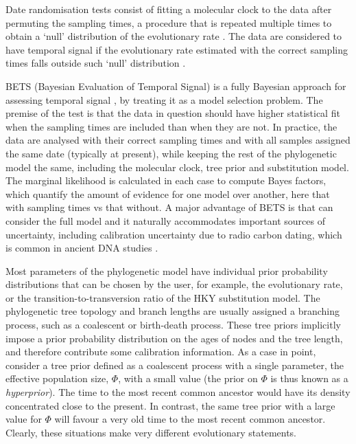 \documentclass[10pt,letterpaper]{article}
\begin{document}
Date randomisation tests consist of fitting a molecular clock to the data after permuting the sampling times, a procedure that is repeated multiple times to obtain a `null' distribution of the evolutionary rate \cite{ramsden2009hantavirus}. The data are considered to have temporal signal if the evolutionary rate estimated with the correct sampling times falls outside such `null' distribution \cite{ramsden2009hantavirus,duchene2015performance}.

BETS (Bayesian Evaluation of Temporal Signal) is a fully Bayesian approach for assessing temporal signal \cite{duchene2020bayesian}, by treating it as a model selection problem. The premise of the test is that the data in question should have higher statistical fit when the sampling times are included than when they are not. In practice, the data are analysed with their correct sampling times and with all samples assigned the same date (typically at present), while keeping the rest of the phylogenetic model the same, including the molecular clock, tree prior and substitution model. The marginal likelihood is calculated in each case to compute Bayes factors, which quantify the amount of evidence for one model over another, here that with sampling times vs that without. A major advantage of BETS is that can consider the full model and it naturally accommodates important sources of uncertainty, including calibration uncertainty due to radio carbon dating, which is common in ancient DNA studies \cite{molak2015empirical}. 

Most parameters of the phylogenetic model have individual prior probability distributions that can be chosen by the user, for example, the evolutionary rate, or the transition-to-transversion ratio of the HKY substitution model. The phylogenetic tree topology and branch lengths are usually assigned a branching process, such as a coalescent or birth-death process. These tree priors implicitly impose a prior probability distribution on the ages of nodes and the tree length, and therefore contribute some calibration information. As a case in point, consider a tree prior defined as a coalescent process with a single parameter, the effective population size, $\Phi$, with a small value (the prior on $\Phi$ is thus known as a \textit{hyperprior}). The time to the most recent common ancestor would have its density concentrated close to the present. In contrast, the same tree prior with a large value for $\Phi$ will favour a very old time to the most recent common ancestor. Clearly, these situations make very different evolutionary statements.
\end{document}
